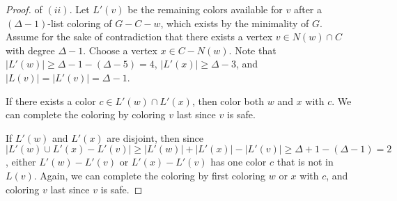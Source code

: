 \documentclass[12pt]{article}
\theoremstyle{definition}
\begin{document}
\begin{proof} of $(ii)$.
Let $L'(v)$ be the remaining colors available for $v$ after a $(\Delta-1)$-list coloring of $G-C-w$, which exists by the minimality of $G$. 
Assume for the sake of contradiction that there exists a vertex $v\in N(w)\cap C$ with degree $\Delta-1$. 
Choose a vertex $x\in C-N(w)$. 
Note that $|L'(w)|\geq \Delta-1-(\Delta-5)=4$, $|L'(x)|\geq \Delta-3$, and $|L(v)|=|L'(v)|=\Delta-1$.

If there exists a color $c\in L'(w)\cap L'(x)$, then color both $w$ and $x$ with $c$.
We can complete the coloring by coloring $v$ last since $v$ is safe.

If $L'(w)$ and $L'(x)$ are disjoint, then since $|L'(w)\cup L'(x)-L'(v)|\geq |L'(w)|+|L'(x)|-|L'(v)|\geq \Delta+1-(\Delta-1)=2$, either $L'(w)-L'(v)$ or $L'(x)-L'(v)$ has one color $c$ that is not in $L(v)$.
Again, we can complete the coloring by first coloring $w$ or $x$ with $c$, and coloring $v$ last since $v$ is safe.
\end{proof}
\end{document}
